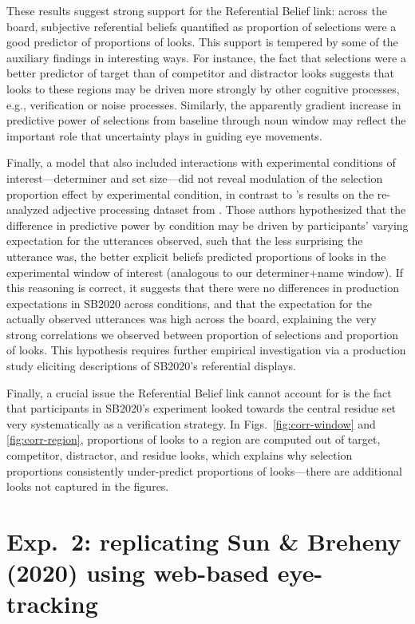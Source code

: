 \documentclass[10pt,letterpaper]{article}
\begin{document}
These results suggest strong support for the Referential Belief link: across the board, subjective referential beliefs quantified as proportion of selections were a good predictor of proportions of looks. This support is tempered by some of the auxiliary findings in interesting ways. For instance, the fact that selections were a better predictor of target than of competitor and distractor looks suggests that looks to these regions may be driven more strongly by other cognitive processes, e.g.,  verification or noise processes. Similarly, the apparently gradient increase in predictive power of selections from baseline through noun window may reflect the important role that uncertainty plays in guiding eye movements.

Finally, a model that also included interactions with experimental conditions of interest---determiner and set size---did not reveal modulation of the selection proportion effect by experimental condition, in contrast to 's results on the re-analyzed adjective processing dataset from . Those authors hypothesized that the difference in predictive power by condition may be driven by participants' varying expectation for the utterances observed, such that the less surprising the utterance was, the better explicit beliefs predicted proportions of looks in the experimental window of interest (analogous to our determiner+name window). If this reasoning is correct, it suggests that there were no differences in production expectations in SB2020 across conditions, and that the expectation for the actually observed utterances was high across the board, explaining the very strong correlations we observed between proportion of selections and proportion of looks. This hypothesis requires further empirical investigation via a production study eliciting descriptions of SB2020's referential displays.

Finally, a crucial issue the Referential Belief link cannot account for is the fact that participants in SB2020's experiment looked towards the central residue set very systematically as a verification strategy. In Figs.~\ref{fig:corr-window} and \ref{fig:corr-region}, proportions of looks to a region are computed out of target, competitor, distractor, and residue looks, which explains why selection proportions consistently under-predict proportions of looks---there are additional looks not captured in the figures. 

\section{Exp.~2: replicating Sun \& Breheny (2020) using web-based eye-tracking}
\end{document}
